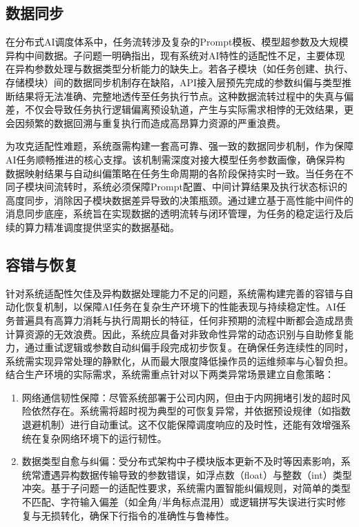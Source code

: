 \subsection{数据同步}

在分布式AI调度体系中，任务流转涉及复杂的Prompt模板、模型超参数及大规模异构中间数据。子问题一明确指出，现有系统对AI特性的适配性不足，主要体现在异构参数处理与数据类型分析能力的缺失上。若各子模块（如任务创建、执行、存储模块）间的数据同步机制存在缺陷，API接入层预先完成的参数纠偏与类型推断结果将无法准确、完整地透传至任务执行节点。这种数据流转过程中的失真与偏差，不仅会导致任务执行逻辑偏离预设轨道，产生与实际需求相悖的无效结果，更会因频繁的数据回溯与重复执行而造成高昂算力资源的严重浪费。

为攻克适配性难题，系统亟需构建一套高可靠、强一致的数据同步机制，作为保障AI任务顺畅推进的核心支撑。该机制需深度对接大模型任务参数画像，确保异构数据映射结果与自动纠偏策略在任务生命周期的各阶段保持实时一致。当任务在不同子模块间流转时，系统必须保障Prompt配置、中间计算结果及执行状态标识的高度同步，消除因子模块数据差异导致的决策瓶颈。通过建立基于高性能中间件的消息同步底座，系统旨在实现数据的透明流转与闭环管理，为任务的稳定运行及后续的算力精准调度提供坚实的数据基础。

\subsection{容错与恢复}

针对系统适配性欠佳及异构数据处理能力不足的问题，系统需构建完善的容错与自动化恢复机制，以保障AI任务在复杂生产环境下的性能表现与持续稳定性。AI任务普遍具有高算力消耗与执行周期长的特征，任何非预期的流程中断都会造成昂贵计算资源的无效浪费。因此，系统应具备对非致命性异常的动态识别与自助修复能力，通过重试逻辑或参数自动纠偏手段完成初步恢复。在确保任务连续性的同时，系统需实现异常处理的静默化，从而最大限度降低操作员的运维频率与心智负担。结合生产环境的实际需求，系统需重点针对以下两类异常场景建立自愈策略：

\begin{enumerate}
    \item 网络通信韧性保障：尽管系统部署于公司内网，但由于内网拥堵引发的超时风险依然存在。系统需将超时视为典型的可恢复异常，并依据预设规律（如指数退避机制）进行自动重试。这不仅能保障调度响应的及时性，还能有效增强系统在复杂网络环境下的运行韧性。
    \item 数据类型自愈与纠偏：受分布式架构中子模块版本更新不及时等因素影响，系统常遭遇异构数据传输导致的参数错误，如浮点数（float）与整数（int）类型冲突。基于子问题一的适配性要求，系统需内置智能纠偏规则，对简单的类型不匹配、字符输入偏差（如全角/半角标点混用）或逻辑拼写失误进行实时修复与无损转化，确保下行指令的准确性与鲁棒性。
\end{enumerate}

